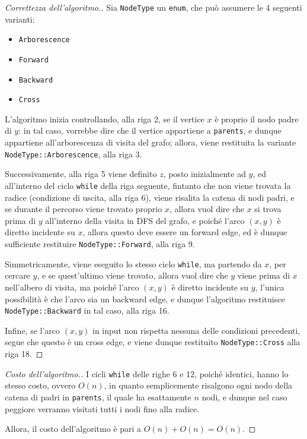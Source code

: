 \documentclass[a4paper, 12pt]{report}
\begin{document}
    \begin{proof}[Correttezza dell'algoritmo.]
        Sia \texttt{NodeType} un \texttt{enum}, che può assumere le 4 seguenti varianti:

        \begin{itemize}
            \item \texttt{Arborescence}
            \item \texttt{Forward}
            \item \texttt{Backward}
            \item \texttt{Cross}
        \end{itemize}

        L'algoritmo inizia controllando, alla riga 2, se il vertice $x$ è proprio il nodo padre di $y$: in tal caso, vorrebbe dire che il vertice appartiene a \texttt{parents}, e dunque appartiene all'arborescenza di visita del grafo; allora, viene restituita la variante \texttt{NodeType::Arborescence}, alla riga 3.

        Successivamente, alla riga 5 viene definito $z$, posto inizialmente ad $y$, ed all'interno del ciclo \texttt{while} della riga seguente, fintanto che non viene trovata la radice (condizione di uscita, alla riga 6), viene risalita la catena di nodi padri, e se durante il percorso viene trovato proprio $x$, allora vuol dire che $x$ si trova prima di $y$ all'interno della visita in DFS del grafo, e poiché l'arco $(x, y)$ è diretto incidente su $x$, allora questo deve essere un forward edge, ed è dunque sufficiente restituire \texttt{NodeType::Forward}, alla riga 9.

        Simmetricamente, viene eseguito lo stesso ciclo \texttt{while}, ma partendo da $x$, per cercare $y$, e se quest'ultimo viene trovato, allora vuol dire che $y$ viene prima di $x$ nell'albero di visita, ma poiché l'arco $(x, y)$ è diretto incidente su $y$, l'unica possibilità è che l'arco sia un backward edge, e dunque l'algoritmo restituisce \texttt{NodeType::Backward} in tal caso, alla riga 16.

        Infine, se l'arco $(x, y)$ in input non rispetta nessuna delle condizioni precedenti, segue che questo è un cross edge, e viene dunque restituito \texttt{NodeType::Cross} alla riga 18.
    \end{proof}

    \begin{proof}[Costo dell'algoritmo.]
        I cicli \texttt{while} delle righe 6 e 12, poiché identici, hanno lo stesso costo, ovvero $O(n)$, in quanto semplicemente risalgono ogni nodo della catena di padri in \texttt{parents}, il quale ha esattamente $n$ nodi, e dunque nel caso peggiore verranno visitati tutti i nodi fino alla radice.

        Allora, il costo dell'algoritmo è pari a $O(n) + O(n) = O(n)$.
    \end{proof}
\end{document}

